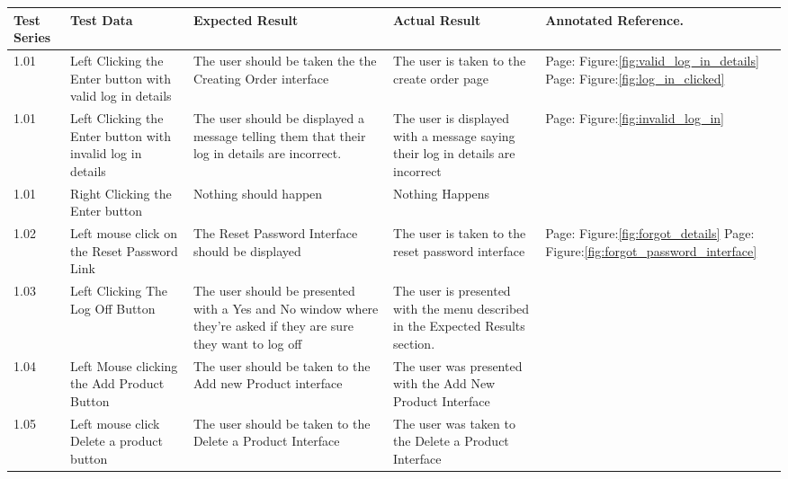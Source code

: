 \begin{flushleft}
    \begin{longtable}{|p{1.0cm}|p{2.5cm}|p{3cm}|p{3.0cm}|p{2.5cm}|}
        \hline
        \textbf{Test Series} & \textbf{Test Data} & \textbf{Expected Result} &  \textbf{Actual Result} &  \textbf{Annotated Reference.}\\ \hline
	1.01 & Left Clicking the Enter button with valid log in details & The user should be taken the the Creating Order interface& The user is taken to the create order page  & Page:\pageref{fig:valid_log_in_details}  \newline Figure:\ref{fig:valid_log_in_details}  \newline  \newline Page:\pageref{fig:log_in_clicked}  \newline Figure:\ref{fig:log_in_clicked} \\ \hline
	1.01 & Left Clicking the Enter button with invalid log in details &The user should be displayed a message telling them that their log in details are incorrect. & The user is displayed with a message saying their log in details are incorrect & Page:\pageref{fig:invalid_log_in}  \newline Figure:\ref{fig:invalid_log_in}\\ \hline
	1.01 & Right Clicking the Enter button & Nothing should happen & Nothing Happens &\\ \hline 
	1.02 & Left mouse click on the Reset Password Link & The Reset Password Interface should be displayed & The user is taken to the reset password interface & Page:\pageref{fig:forgot_details}  \newline Figure:\ref{fig:forgot_details}  \newline  \newline Page:\pageref{fig:forgot_password_interface}  \newline Figure:\ref{fig:forgot_password_interface}\\ \hline
	1.03 & Left Clicking The Log Off Button & The user should be presented with a Yes and No window where they're asked if they are sure they want to log off& The user is presented with the menu described in the Expected Results section.&\\ \hline
	1.04 & Left Mouse clicking the Add Product Button & The user should be taken to the Add new Product interface& The user was presented with the Add New Product Interface & \\ \hline
	1.05 &  Left mouse click Delete a product button& The user should be taken to the Delete a Product Interface & The user was taken to the Delete a Product Interface & \\ \hline

\end{longtable}
\end{flushleft}
